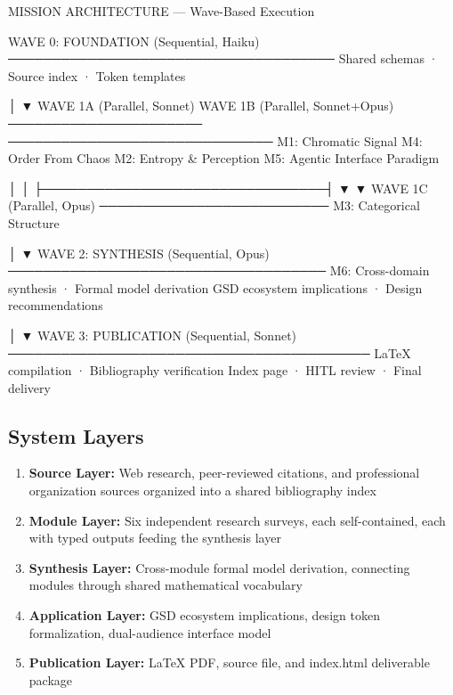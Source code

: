 \documentclass[11pt,letterpaper]{article}
\begin{document}
\begin{asciibox}
MISSION ARCHITECTURE — Wave-Based Execution

  WAVE 0: FOUNDATION (Sequential, Haiku)
  ─────────────────────────────────────
  Shared schemas · Source index · Token templates

          │
          ▼
  WAVE 1A (Parallel, Sonnet)      WAVE 1B (Parallel, Sonnet+Opus)
  ──────────────────────          ──────────────────────────────
  M1: Chromatic Signal            M4: Order From Chaos
  M2: Entropy & Perception        M5: Agentic Interface Paradigm

          │                                │
          ├────────────────────────────────┤
          ▼                                ▼
  WAVE 1C (Parallel, Opus)
  ──────────────────────────
  M3: Categorical Structure

          │
          ▼
  WAVE 2: SYNTHESIS (Sequential, Opus)
  ────────────────────────────────────
  M6: Cross-domain synthesis · Formal model derivation
  GSD ecosystem implications · Design recommendations

          │
          ▼
  WAVE 3: PUBLICATION (Sequential, Sonnet)
  ─────────────────────────────────────────
  LaTeX compilation · Bibliography verification
  Index page · HITL review · Final delivery
\end{asciibox}

\subsection{System Layers}

\begin{enumerate}[leftmargin=2em, itemsep=0.4em]
  \item \textbf{Source Layer:} Web research, peer-reviewed citations, and professional organization sources organized into a shared bibliography index
  \item \textbf{Module Layer:} Six independent research surveys, each self-contained, each with typed outputs feeding the synthesis layer
  \item \textbf{Synthesis Layer:} Cross-module formal model derivation, connecting modules through shared mathematical vocabulary
  \item \textbf{Application Layer:} GSD ecosystem implications, design token formalization, dual-audience interface model
  \item \textbf{Publication Layer:} LaTeX PDF, source file, and index.html deliverable package
\end{enumerate}
\end{document}
